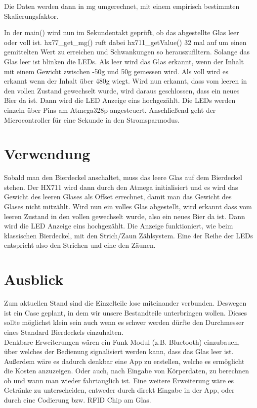 \documentclass[12pt,journal]{IEEEtran}
\begin{document}
\hfil

\hfil

Die Daten werden dann in mg umgerechnet, mit einem empirisch bestimmten Skalierungsfaktor.

\hfil

\hfil

In der main() wird nun im Sekundentakt geprüft, ob das abgestellte Glas leer oder voll ist.
hx77\_get\_mg() ruft dabei hx711\_getValue() 32 mal auf um einen gemittelten Wert zu erreichen
und Schwankungen so herauszufiltern. Solange das Glas leer ist blinken die LEDs. Als leer wird das
Glas erkannt, wenn der Inhalt mit einem Gewicht zwischen -50g und 50g gemessen wird.
Als voll wird es erkannt wenn der Inhalt über 480g wiegt.
Wird nun erkannt, dass vom leeren in den vollen Zustand gewechselt wurde, wird daraus geschlossen, dass ein
neues Bier da ist. Dann wird die LED Anzeige eins hochgezählt. Die LEDs werden einzeln über Pins
am Atmega328p angesteuert.
Anschließend geht der Microcontroller für eine Sekunde in den Stromsparmodus.



\section{Verwendung}

Sobald man den Bierdeckel anschaltet, muss das leere Glas auf dem Bierdeckel stehen.
Der HX711 wird dann durch den Atmega initialisiert und es wird das Gewicht des leeren Glases
als Offset errechnet, damit man das Gewicht des Glases nicht mitzählt. Wird nun ein volles Glas
abgestellt, wird erkannt dass vom leeren Zustand in den vollen gewechselt wurde, also ein neues
Bier da ist. Dann wird die LED Anzeige eins hochgezählt. Die Anzeige funktioniert,
wie beim klassischen Bierdeckel, mit den Strich/Zaun Zählsystem. Eine 4er Reihe der LEDs
entspricht also den Strichen und eine den Zäunen.

\section{Ausblick}

Zum aktuellen Stand sind die Einzelteile lose miteinander verbunden. Deswegen ist ein Case
geplant, in dem wir unsere Bestandteile unterbringen wollen. Dieses sollte möglichst klein sein
auch wenn es schwer werden dürfte den Durchmesser eines Standard Bierdeckels einzuhalten.\\
Denkbare Erweiterungen wären ein Funk Modul (z.B. Bluetooth) einzubauen, über welches der Bedienung signalisiert werden kann, dass das Glas leer ist.
Außerdem wäre es dadurch denkbar eine App zu erstellen, welche es ermöglicht die Kosten anzuzeigen.
Oder auch, nach Eingabe von Körperdaten, zu berechnen ob und wann man wieder fahrtauglich ist.
Eine weitere Erweiterung wäre es Getränke zu unterscheiden, entweder durch direkt Eingabe in der App, oder durch eine Codierung bzw. RFID Chip am Glas.
\end{document}
